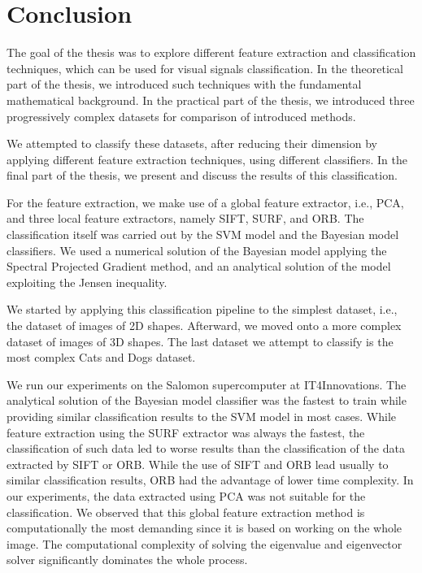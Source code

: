\chapter{Conclusion}
The goal of the thesis was to explore different feature extraction and classification techniques, which can be used for visual signals classification. In the theoretical part of the thesis, we introduced such techniques with the fundamental mathematical background. In the practical part of the thesis, we introduced three progressively complex datasets for comparison of introduced methods.

We attempted to classify these datasets, after reducing their dimension by applying different feature extraction techniques, using different classifiers. In the final part of the thesis, we present and discuss the results of this classification.

For the feature extraction, we make use of a global feature extractor, i.e., PCA, and three local feature extractors, namely SIFT, SURF, and ORB. The classification itself was carried out by the SVM model and the Bayesian model classifiers. We used a numerical solution of the Bayesian model applying the Spectral Projected Gradient method, and an analytical solution of the model exploiting the Jensen inequality.

We started by applying this classification pipeline to the simplest dataset, i.e., the dataset of images of 2D shapes. Afterward, we moved onto a more complex dataset of images of 3D shapes. The last dataset we attempt to classify is the most complex Cats and Dogs dataset.

We run our experiments on the Salomon supercomputer at IT4Innovations. The analytical solution of the Bayesian model classifier was the fastest to train while providing similar classification results to the SVM model in most cases. While feature extraction using the SURF extractor was always the fastest, the classification of such data led to worse results than the classification of the data extracted by SIFT or ORB. While the use of SIFT and ORB lead usually to similar classification results, ORB had the advantage of lower time complexity. In our experiments, the data extracted using PCA was not suitable for the classification. We observed that this global feature extraction method is computationally the most demanding since it is based on working on the whole image. The computational complexity of solving the eigenvalue and eigenvector solver significantly dominates the whole process.

